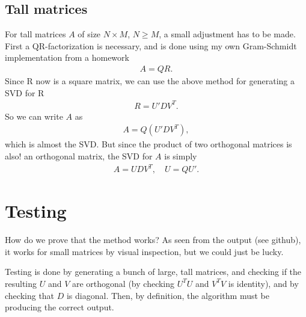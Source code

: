 \documentclass{article}
\begin{document}
    \subsection{Tall matrices}
    For tall matrices $ A $ of size $ N\times M $, $ N\geq M $, a small adjustment has to be made. First a QR-factorization is necessary, and is done using my own Gram-Schmidt implementation from a homework
    \begin{align}
    	A=QR.
    \end{align}
    Since R now is a square matrix, we can use the above method for generating a SVD for R
    \begin{align}
    	R = U'DV^T.
    \end{align}
	So we can write $ A $ as
	\begin{align}
		A = Q(U'DV^T),
	\end{align}
	which is almost the SVD. But since the product of two orthogonal matrices is also! an orthogonal matrix, the SVD for $ A $ is simply
	\begin{align}
		A = UDV^T,\quad U = QU'.
	\end{align}
    
    \section{Testing}
    How do we prove that the method works? As seen from the output (see github), it works for small matrices by visual inspection, but we could just be lucky.
    
    Testing is done by generating a bunch of large, tall matrices, and checking if the resulting $ U $ and $ V $ are orthogonal (by checking $ U^TU $ and $ V^TV $ is identity), and by checking that $ D $ is diagonal. Then, by definition, the algorithm must be producing the correct output. 
    
\end{document}
